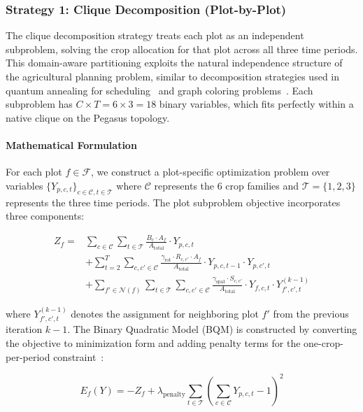 \documentclass{oqireport}
\begin{document}
\subsubsection{Strategy 1: Clique Decomposition (Plot-by-Plot)}

The clique decomposition strategy treats each plot as an independent subproblem, solving the crop allocation for that plot across all three time periods. This domain-aware partitioning exploits the natural independence structure of the agricultural planning problem, similar to decomposition strategies used in quantum annealing for scheduling~\cite{venturelli2015quantum} and graph coloring problems~\cite{titiloye2011quantum}. Each subproblem has $C \times T = 6 \times 3 = 18$ binary variables, which fits perfectly within a native clique on the Pegasus topology.

\paragraph{Mathematical Formulation}

For each plot $f \in \mathcal{F}$, we construct a plot-specific optimization problem over variables $\{Y_{p,c,t}\}_{c \in \mathcal{C}, t \in \mathcal{T}}$ where $\mathcal{C}$ represents the 6 crop families and $\mathcal{T} = \{1,2,3\}$ represents the three time periods. The plot subproblem objective incorporates three components:

\begin{align}
Z_f = & \sum_{c \in \mathcal{C}} \sum_{t \in \mathcal{T}} \frac{B_c \cdot A_f}{A_{\text{total}}} \cdot Y_{p,c,t} \label{eq:plot_benefit} \\
& + \sum_{t=2}^{T} \sum_{c, c' \in \mathcal{C}} \frac{\gamma_{\text{rot}} \cdot R_{c, c'} \cdot A_f}{A_{\text{total}}} \cdot Y_{p,c,t-1} \cdot Y_{p,c',t} \label{eq:plot_rotation} \\
& + \sum_{f' \in \mathcal{N}(f)} \sum_{t \in \mathcal{T}} \sum_{c, c' \in \mathcal{C}} \frac{\gamma_{\text{spat}} \cdot S_{c,c'}}{A_{\text{total}}} \cdot Y_{f,c,t} \cdot Y_{f',c',t}^{(k-1)} \label{eq:plot_spatial}
\end{align}

where $Y_{f',c',t}^{(k-1)}$ denotes the assignment for neighboring plot $f'$ from the previous iteration $k-1$. The Binary Quadratic Model (BQM) is constructed by converting the objective to minimization form and adding penalty terms for the one-crop-per-period constraint~\cite{lucas2014ising}:

\begin{equation}
E_f(Y) = -Z_f + \lambda_{\text{penalty}} \sum_{t \in \mathcal{T}} \left(\sum_{c \in \mathcal{C}} Y_{p,c,t} -1\right)^2
\end{equation}
\end{document}

